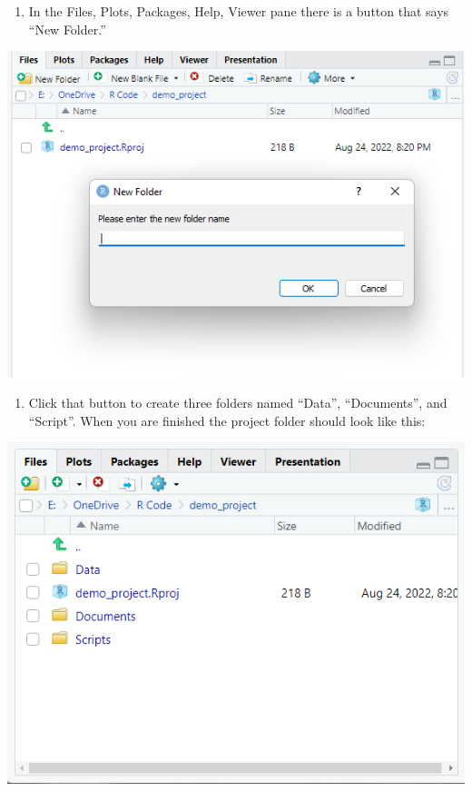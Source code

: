 \documentclass[
]{book}
\providecommand{\tightlist}{%
  \setlength{\itemsep}{0pt}\setlength{\parskip}{0pt}}
\begin{document}
\begin{enumerate}
\def\labelenumi{\arabic{enumi}.}
\setcounter{enumi}{1}
\tightlist
\item
  In the Files, Plots, Packages, Help, Viewer pane there is a button that says ``New Folder.''
\end{enumerate}

\includegraphics{images/newfolder.png}

\begin{enumerate}
\def\labelenumi{\arabic{enumi}.}
\setcounter{enumi}{2}
\tightlist
\item
  Click that button to create three folders named ``Data'', ``Documents'', and ``Script''. When you are finished the project folder should look like this:
\end{enumerate}

\includegraphics{images/tiermain.png}
\end{document}
